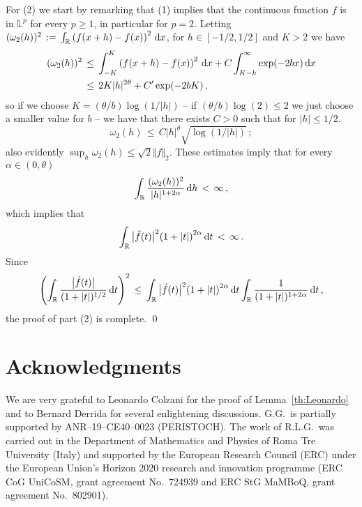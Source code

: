 \documentclass[reqno,11pt]{amsart}
\numberwithin{equation}{section}
\newcommand{\dd}{\,\text{\rm d}}             %
\newcommand{\bbL}{{\ensuremath{\mathbb L}} }
\newcommand{\bbR}{{\ensuremath{\mathbb R}} }
\newcommand{\ga}{\alpha}
\newcommand{\go}{\omega}
\begin{document}
For (2) we start by remarking that (1) implies that the continuous function $f$ is in $\bbL^p$ for every $p\ge 1$,
in particular for $p=2$. 
Letting 
$(\go_2(h))^2\, := \, \int_\bbR \left( f(x+h) - f(x)\right)^2 \dd x $,
for $h \in [-1/2,1/2]$ and $K>2$ we have
\begin{equation}
\begin{split}
(\go_2(h))^2\, 
&\le\, \int_{-K}^K \left( f(x+h) - f(x)\right)^2 \dd x + C \int_{K-h}^\infty \exp(-2b x) \dd x
\\
&\le \, 2K \vert h \vert ^{2\theta} + C' \exp(-2bK)\, , 
\end{split}
\end{equation}
so if we choose $K=(\theta/b) \log (1/ \vert h \vert)$ -- if  $(\theta/b) \log (2)\le 2$ we  just choose a smaller value for  $b$ -- we have that there exists $C>0$ such that for $\vert h \vert \le 1/2$.
\begin{equation}
\go_2(h) \, \le \, C \vert h \vert ^\theta \sqrt{ \log(1/ \vert h \vert)}\, ;
\end{equation}
also evidently
$\sup_h \go_2(h) \le \sqrt{2} \Vert f \Vert_2$. These estimates imply that for every $\ga\in(0, \theta)$
\begin{equation}
\int_ \bbR \frac{ (\go_2(h))^2}{\vert h \vert ^{1+2\ga}} \dd h\, < \, \infty\,,  
\end{equation}
which implies \cite[Ch.~5: (46) and paragraph after (47)]{cf:Stein} that
\begin{equation}
\int_\bbR { \big \vert  \hat f (t)\big\vert ^2}
{\left(1+ \vert t \vert \right)^{2\ga}}\dd t \, < \, \infty\, . 
\end{equation}
Since
\begin{equation}
\left(
\int_\bbR \frac{ \big\vert \hat f (t)\big\vert }{(1+\vert t \vert)^{1/2}} \dd t \right)^2
\, \le \, \int_\bbR { \big \vert  \hat f (t)\big\vert ^2}
{\left(1+ \vert t \vert \right)^{2\ga}}\dd t
\int_\bbR \frac{ 1 }{(1+\vert t \vert)^{1+2\ga}} \dd t \,,
\end{equation}
the proof of part (2) is complete.
\qed

\section*{Acknowledgments}

\begin{sloppypar}
	We are very grateful to Leonardo Colzani for the proof of Lemma~\ref{th:Leonardo} and to Bernard Derrida for several enlightening discussions.
	G.G.\ is partially supported by ANR–19–CE40–0023 (PERISTOCH).
	The work of R.L.G.\ was carried out in the Department of Mathematics and Physics of Roma Tre University (Italy) and supported by the European Research Council (ERC) under the European Union's Horizon 2020 research and innovation programme (ERC CoG UniCoSM, grant agreement No.\ 724939 and ERC StG MaMBoQ, grant agreement No.\ 802901). 
\end{sloppypar}
  
\end{document}
